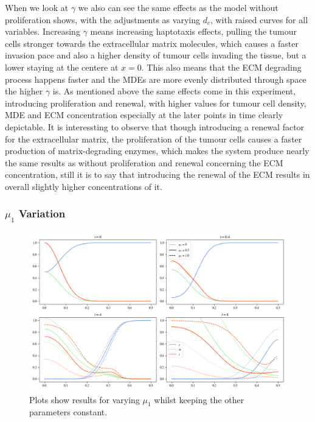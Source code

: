When we look at $\gamma$ we also can see the same effects as the model without proliferation shows, with the adjustments as varying $d_c$, with raised curves for all variables. Increasing $\gamma$ means increasing haptotaxis effects, pulling the tumour cells stronger towards the extracellular matrix molecules, which causes a faster invasion pace and also a higher density of tumour cells invading the tissue, but a lower staying at the centere at $x=0$. This also means that the ECM degrading process happens faster and the MDEs are more evenly distributed through space the higher $\gamma$ is. As mentioned above the same effects come in this experiment, introducing proliferation and renewal, with higher values for tumour cell density, MDE and ECM concentration especially at the later points in time clearly depictable. It is interessting to observe that though introducing a renewal factor for the extracellular matrix, the proliferation of the tumour cells causes a faster production of matrix-degrading enzymes, which makes the system produce nearly the same results as without proliferation and renewal concerning the ECM concentration, still  it is to say that introducing the renewal of the ECM results in overall slightly higher concentrations of it.

\subsubsection*{$\mu_1$ Variation}
\begin{figure}[h]
    \centering
    \includegraphics[width=\textwidth]{resources/images/prolif_mu_1_variation.png}
    \caption{Plots show results for varying $\mu_1$ whilst keeping the other parameters constant.}
    \label{fig:prolif_mu_1_variation}
\end{figure}


